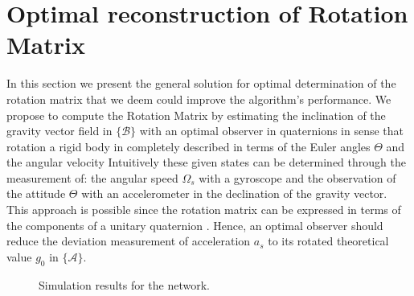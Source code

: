 \documentclass[10pt,conference]{IEEEtran}
\newcommand{\marco}[1]{\{\mathcal{#1}\}}
\begin{document}
\section{Optimal reconstruction of Rotation Matrix \label{opt_reconstruction}}
In this section we present the general solution for optimal determination of the rotation matrix that we deem could improve the algorithm's performance. We propose to compute the Rotation Matrix by estimating the inclination of the gravity vector field in $\marco{B}$  with an optimal observer in quaternions  in sense that rotation a rigid body in completely described in terms of the Euler angles $\Theta$ and the angular velocity Intuitively these given states can be determined through the measurement of: the angular speed $\Omega_s$ with a gyroscope and the observation of the attitude $\Theta$ with an accelerometer in the declination of the gravity vector. This approach is possible since the rotation matrix can be expressed in terms of the components of a unitary quaternion \cite{Altmann1986}. Hence, an optimal observer should reduce the deviation measurement of acceleration $a_s$ to its rotated theoretical value $g_0$ in $\marco{A}$.\par
\begin{figure}[!t]
\centering
{}
\caption{Simulation results for the network.}
\label{Plots}
\end{figure}
\end{document}
